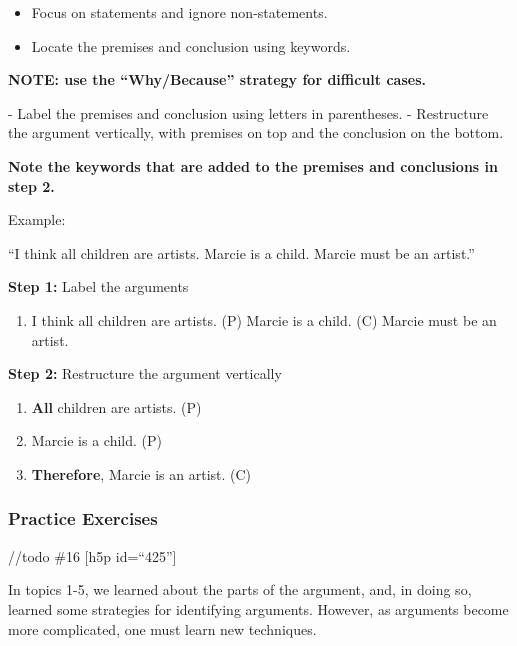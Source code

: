 \documentclass[
]{book}
\providecommand{\tightlist}{%
  \setlength{\itemsep}{0pt}\setlength{\parskip}{0pt}}
\begin{document}
\begin{itemize}
\tightlist
\item
  Focus on statements and ignore non-statements.
\item
  Locate the premises and conclusion using keywords.
\end{itemize}

\begin{progress}
\textbf{NOTE: use the ``Why/Because'' strategy for difficult cases.}
\end{progress}
- Label the premises and conclusion using letters in parentheses.
- Restructure the argument vertically, with premises on top and the conclusion on the bottom.

\begin{progress}
\textbf{Note the keywords that are added to the premises and conclusions in step 2.}
\end{progress}

Example:

``I think all children are artists. Marcie is a child. Marcie must be an artist.''

\textbf{Step 1:} Label the arguments

\begin{enumerate}
\def\labelenumi{(\Alph{enumi})}
\setcounter{enumi}{15}
\tightlist
\item
  I think all children are artists. (P) Marcie is a child. (C) Marcie must be an artist.
\end{enumerate}

\textbf{Step 2:} Restructure the argument vertically

\begin{enumerate}
\def\labelenumi{\arabic{enumi}.}
\tightlist
\item
  \textbf{All} children are artists. (P)
\item
  Marcie is a child. (P)
\item
  \textbf{Therefore}, Marcie is an artist. (C)
\end{enumerate}

\hypertarget{practice-exercises-1}{%
\subsubsection*{Practice Exercises}\label{practice-exercises-1}}

//todo \#16
{[}h5p id=``425''{]}

In topics 1-5, we learned about the parts of the argument, and, in doing so, learned some strategies for identifying arguments. However, as arguments become more complicated, one must learn new techniques.
\end{document}
